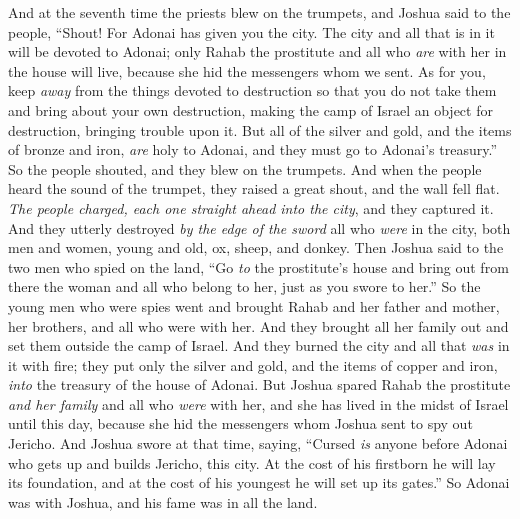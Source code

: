 \begin{biblechapter}
\verse And at the seventh time the priests blew on the trumpets, and Joshua said to the people, “Shout! For Adonai has given you the city.
\verse The city and all that is in it will be devoted to Adonai; only Rahab the prostitute and all who \textit{are} with her in the house will live, because she hid the messengers whom we sent.
\verse As for you, keep \textit{away} from the things devoted to destruction so that you do not take them and bring about your own destruction, making the camp of Israel an object for destruction, bringing trouble upon it.
\verse But all of the silver and gold, and the items of bronze and iron, \textit{are} holy to Adonai, and they must go to Adonai’s treasury.”
\verse So the people shouted, and they blew on the trumpets. And when the people heard the sound of the trumpet, they raised a great shout, and the wall fell flat. \textit{The people charged, each one straight ahead into the city}, and they captured it.
\verse And they utterly destroyed \textit{by the edge of the sword} all who \textit{were} in the city, both men and women, young and old, ox, sheep, and donkey.
\verse Then Joshua said to the two men who spied on the land, “Go \textit{to} the prostitute’s house and bring out from there the woman and all who belong to her, just as you swore to her.”
\verse So the young men who were spies went and brought Rahab and her father and mother, her brothers, and all who were with her. And they brought all her family out and set them outside the camp of Israel.
\verse And they burned the city and all that \textit{was} in it with fire; they put only the silver and gold, and the items of copper and iron, \textit{into} the treasury of the house of Adonai.
\verse But Joshua spared Rahab the prostitute \textit{and her family} and all who \textit{were} with her, and she has lived in the midst of Israel until this day, because she hid the messengers whom Joshua sent to spy out Jericho.
\verse And Joshua swore at that time, saying, “Cursed \textit{is} anyone before Adonai who gets up and builds Jericho, this city. At the cost of his firstborn he will lay its foundation, and at the cost of his youngest he will set up its gates.”
\verse So Adonai was with Joshua, and his fame was in all the land.
\end{biblechapter}

